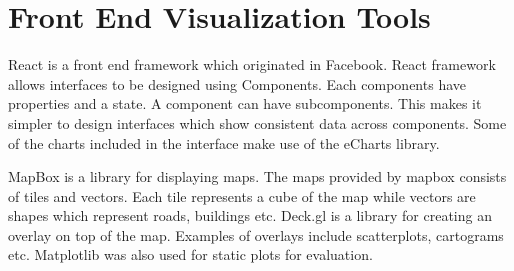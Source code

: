 \section{Front End Visualization Tools}
React\citep{reactjs} is a front end framework which originated in Facebook. React framework allows interfaces to be designed using Components. Each components have properties and a state. A component can have subcomponents. This makes it simpler to design interfaces which show consistent data across components. Some of the charts included in the interface make use of the eCharts library\citep{echarts}.

MapBox\citep{mapbox} is a library for displaying maps. The maps provided by mapbox consists of tiles and vectors. Each tile represents a cube of the map while vectors are shapes which represent roads, buildings etc. Deck.gl\citep{deckgl} is a library for creating an overlay on top of the map. Examples of overlays include scatterplots, cartograms etc. Matplotlib was also used for static plots for evaluation\citep{hunter2007matplotlib}.
